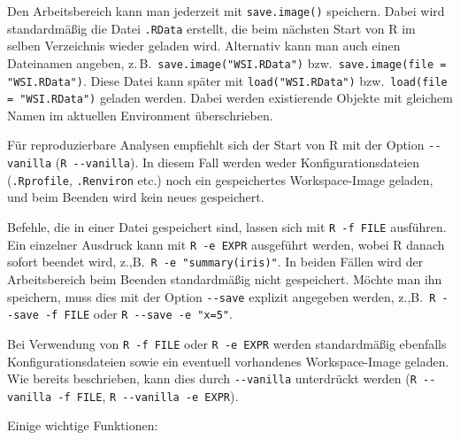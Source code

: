 \documentclass[10pt,twocolumn]{scrartcl}
\begin{document}
Den Arbeitsbereich kann man jederzeit mit \lstinline|save.image()| speichern. Dabei wird standardmäßig die Datei \lstinline|.RData| erstellt, die beim nächsten Start von R im selben Verzeichnis wieder geladen wird. Alternativ kann man auch einen Dateinamen angeben, z.\,B.\ \lstinline|save.image("WSI.RData")| bzw.\ \lstinline|save.image(file = "WSI.RData")|. Diese Datei kann später mit \lstinline|load("WSI.RData")| bzw.\ \lstinline|load(file = "WSI.RData")| geladen werden. Dabei werden existierende Objekte mit gleichem Namen im aktuellen Environment überschrieben.

Für reproduzierbare Analysen empfiehlt sich der Start von R mit der Option \lstinline|--vanilla| (\lstinline|R --vanilla|). In diesem Fall werden weder Konfigurationsdateien (\lstinline|.Rprofile|, \lstinline|.Renviron| etc.) noch ein gespeichertes Workspace-Image geladen, und beim Beenden wird kein neues gespeichert.

Befehle, die in einer Datei gespeichert sind, lassen sich mit \lstinline|R -f FILE| ausführen. Ein einzelner Ausdruck kann mit \lstinline|R -e EXPR| ausgeführt werden, wobei R danach sofort beendet wird, z.,B.\ \lstinline|R -e "summary(iris)"|. In beiden Fällen wird der Arbeitsbereich beim Beenden standardmäßig nicht gespeichert. Möchte man ihn speichern, muss dies mit der Option \lstinline|--save| explizit angegeben werden, z.,B.\ \lstinline|R --save -f FILE| oder \lstinline|R --save -e "x=5"|.

Bei Verwendung von \lstinline|R -f FILE| oder \lstinline|R -e EXPR| werden standardmäßig ebenfalls Konfigurationsdateien sowie ein eventuell vorhandenes Workspace-Image geladen. Wie bereits beschrieben, kann dies durch \lstinline|--vanilla| unterdrückt werden (\lstinline|R --vanilla -f FILE|, \lstinline|R --vanilla -e EXPR|).


Einige wichtige Funktionen:
\end{document}
